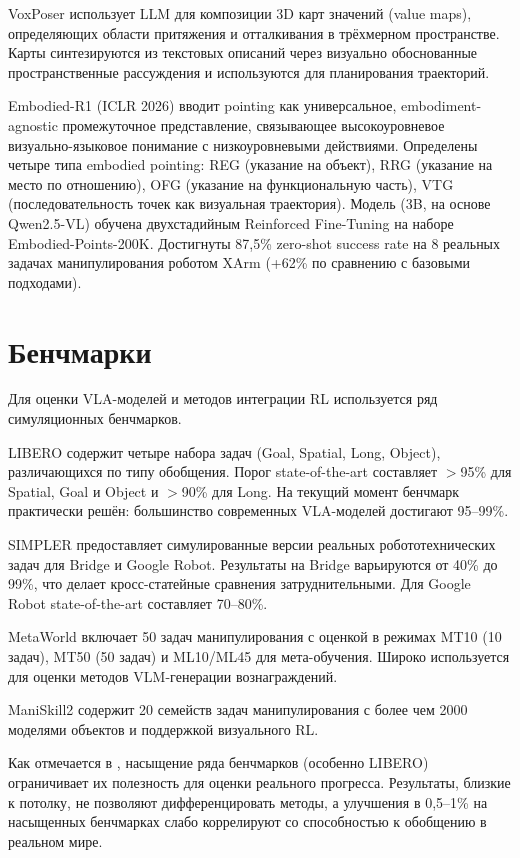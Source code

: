    VoxPoser \cite{huang2023voxposer} использует LLM для композиции 3D карт значений (value maps), определяющих области притяжения и отталкивания в трёхмерном пространстве. Карты синтезируются из текстовых описаний через визуально обоснованные пространственные рассуждения и используются для планирования траекторий.

    Embodied-R1 \cite{embodiedr1_2026} (ICLR 2026) вводит pointing как универсальное, embodiment-agnostic промежуточное представление, связывающее высокоуровневое визуально-языковое понимание с низкоуровневыми действиями. Определены четыре типа embodied pointing: REG (указание на объект), RRG (указание на место по отношению), OFG (указание на функциональную часть), VTG (последовательность точек как визуальная траектория). Модель (3B, на основе Qwen2.5-VL) обучена двухстадийным Reinforced Fine-Tuning на наборе Embodied-Points-200K. Достигнуты 87,5\% zero-shot success rate на 8 реальных задачах манипулирования роботом XArm (+62\% по сравнению с базовыми подходами).

\section{Бенчмарки}
\label{sec:benchmarks}

    Для оценки VLA-моделей и методов интеграции RL используется ряд симуляционных бенчмарков.

    LIBERO \cite{liu2023libero} содержит четыре набора задач (Goal, Spatial, Long, Object), различающихся по типу обобщения. Порог state-of-the-art составляет $>$95\% для Spatial, Goal и Object и $>$90\% для Long. На текущий момент бенчмарк практически решён: большинство современных VLA-моделей достигают 95--99\%.

    SIMPLER \cite{simpler2024} предоставляет симулированные версии реальных робототехнических задач для Bridge и Google Robot. Результаты на Bridge варьируются от 40\% до 99\%, что делает кросс-статейные сравнения затруднительными. Для Google Robot state-of-the-art составляет 70--80\%.

    MetaWorld \cite{yu2020metaworld} включает 50 задач манипулирования с оценкой в режимах MT10 (10 задач), MT50 (50 задач) и ML10/ML45 для мета-обучения. Широко используется для оценки методов VLM-генерации вознаграждений.

    ManiSkill2 \cite{gu2023maniskill2} содержит 20 семейств задач манипулирования с более чем 2000 моделями объектов и поддержкой визуального RL.

    Как отмечается в \cite{reuss2025blog}, насыщение ряда бенчмарков (особенно LIBERO) ограничивает их полезность для оценки реального прогресса. Результаты, близкие к потолку, не позволяют дифференцировать методы, а улучшения в 0,5--1\% на насыщенных бенчмарках слабо коррелируют со способностью к обобщению в реальном мире.

